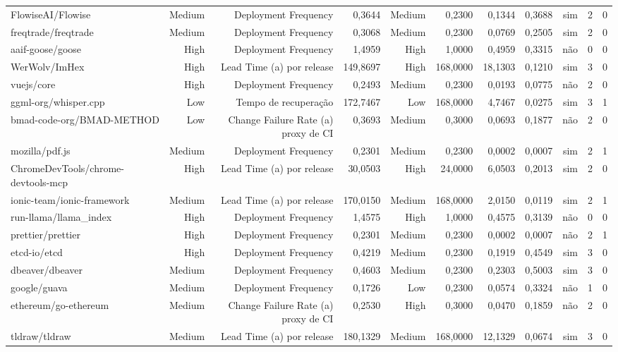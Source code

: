 \begin{tabular}{lrrrrrrrrrr}
FlowiseAI/Flowise & Medium & Deployment Frequency & 0,3644 & Medium & 0,2300 & 0,1344 & 0,3688 & sim & 2 & 0 \\
freqtrade/freqtrade & Medium & Deployment Frequency & 0,3068 & Medium & 0,2300 & 0,0769 & 0,2505 & sim & 2 & 0 \\
aaif-goose/goose & High & Deployment Frequency & 1,4959 & High & 1,0000 & 0,4959 & 0,3315 & não & 0 & 0 \\
WerWolv/ImHex & High & Lead Time (a) por release & 149,8697 & High & 168,0000 & 18,1303 & 0,1210 & sim & 3 & 0 \\
vuejs/core & High & Deployment Frequency & 0,2493 & Medium & 0,2300 & 0,0193 & 0,0775 & não & 2 & 0 \\
ggml-org/whisper.cpp & Low & Tempo de recuperação & 172,7467 & Low & 168,0000 & 4,7467 & 0,0275 & sim & 3 & 1 \\
bmad-code-org/BMAD-METHOD & Low & Change Failure Rate (a) proxy de CI & 0,3693 & Medium & 0,3000 & 0,0693 & 0,1877 & não & 2 & 0 \\
mozilla/pdf.js & Medium & Deployment Frequency & 0,2301 & Medium & 0,2300 & 0,0002 & 0,0007 & sim & 2 & 1 \\
ChromeDevTools/chrome-devtools-mcp & High & Lead Time (a) por release & 30,0503 & High & 24,0000 & 6,0503 & 0,2013 & sim & 2 & 0 \\
ionic-team/ionic-framework & Medium & Lead Time (a) por release & 170,0150 & Medium & 168,0000 & 2,0150 & 0,0119 & sim & 2 & 1 \\
run-llama/llama\_index & High & Deployment Frequency & 1,4575 & High & 1,0000 & 0,4575 & 0,3139 & não & 0 & 0 \\
prettier/prettier & High & Deployment Frequency & 0,2301 & Medium & 0,2300 & 0,0002 & 0,0007 & não & 2 & 1 \\
etcd-io/etcd & High & Deployment Frequency & 0,4219 & Medium & 0,2300 & 0,1919 & 0,4549 & sim & 3 & 0 \\
dbeaver/dbeaver & Medium & Deployment Frequency & 0,4603 & Medium & 0,2300 & 0,2303 & 0,5003 & sim & 3 & 0 \\
google/guava & Medium & Deployment Frequency & 0,1726 & Low & 0,2300 & 0,0574 & 0,3324 & não & 1 & 0 \\
ethereum/go-ethereum & Medium & Change Failure Rate (a) proxy de CI & 0,2530 & High & 0,3000 & 0,0470 & 0,1859 & não & 2 & 0 \\
tldraw/tldraw & Medium & Lead Time (a) por release & 180,1329 & Medium & 168,0000 & 12,1329 & 0,0674 & sim & 3 & 0 \\

\end{tabular}
